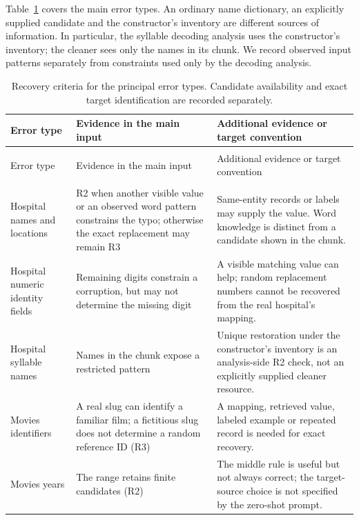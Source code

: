 \documentclass[10pt,a4paper]{article}
\renewcommand{\thetable}{S\arabic{table}}
\begin{document}
Table~\ref{report-recovery-coverage} covers the main error types. An ordinary name dictionary,
an explicitly supplied candidate and the constructor's inventory are different sources
of information. In particular, the syllable decoding analysis uses the constructor's inventory;
the cleaner sees only the names in its chunk. We record observed input patterns separately
from constraints used only by the decoding analysis.

\begingroup\small\setlength{\tabcolsep}{3pt}
\begin{longtable}{@{}>{\raggedright\arraybackslash}p{}>{\raggedright\arraybackslash}p{}>{\raggedright\arraybackslash}p{}@{}}
\caption{Recovery criteria for the principal error types. Candidate availability and exact
target identification are recorded separately.}\label{report-recovery-coverage}\\
\toprule
Error type & Evidence in the main input & Additional evidence or target convention \\
\midrule
\endfirsthead
\multicolumn{3}{l}{\small Table \thetable\ (continued)}\\
\toprule
Error type & Evidence in the main input & Additional evidence or target convention \\
\midrule
\endhead
\midrule\multicolumn{3}{r}{\footnotesize Continued on next page}\\\endfoot
\bottomrule\endlastfoot
Hospital names and locations & R2 when another visible value or an observed word pattern constrains the typo; otherwise the exact replacement may remain R3 & Same-entity records or labels may supply the value. Word knowledge is distinct from a candidate shown in the chunk. \\
Hospital numeric identity fields & Remaining digits constrain a corruption, but may not determine the missing digit & A visible matching value can help; random replacement numbers cannot be recovered from the real hospital's mapping. \\
Hospital syllable names & Names in the chunk expose a restricted pattern & Unique restoration under the constructor's inventory is an analysis-side R2 check, not an explicitly supplied cleaner resource. \\
Movies identifiers & A real slug can identify a familiar film; a fictitious slug does not determine a random reference ID (R3) & A mapping, retrieved value, labeled example or repeated record is needed for exact recovery. \\
Movies years & The range retains finite candidates (R2) & The middle rule is useful but not always correct; the target-source choice is not specified by the zero-shot prompt. \\

\end{longtable}
\end{document}
